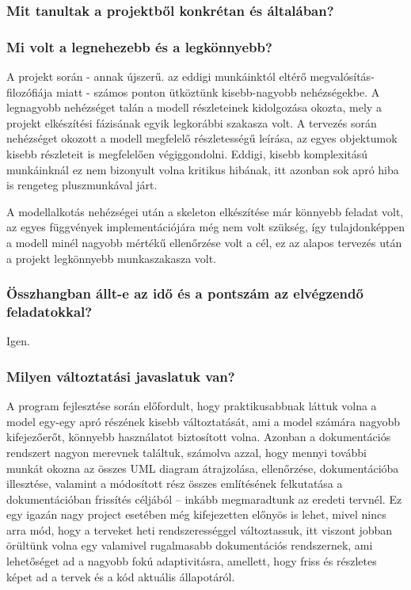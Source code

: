		\subsubsection*{Mit tanultak a projektből konkrétan és általában?}
		
		\subsubsection*{Mi volt a legnehezebb és a legkönnyebb?}
A projekt során - annak újszerű. az eddigi munkáinktól eltérő megvalósítás-filozófiája miatt - számos ponton ütköztünk kisebb-nagyobb nehézségekbe. A legnagyobb nehézséget talán a modell részleteinek kidolgozása okozta, mely a projekt elkészítési fázisának egyik legkorábbi szakasza volt. A tervezés során nehézséget okozott a modell megfelelő részletességű leírása, az egyes objektumok kisebb részleteit is megfelelően végiggondolni. Eddigi, kisebb komplexitású munkáinknál ez nem bizonyult volna kritikus hibának, itt azonban sok apró hiba is rengeteg pluszmunkával járt.

A modellalkotás nehézségei után a skeleton elkészítése már könnyebb feladat volt, az egyes függvények implementációjára még nem volt szükség, így tulajdonképpen a modell minél nagyobb mértékű ellenőrzése volt a cél, ez az alapos tervezés után a projekt legkönnyebb munkaszakasza volt.
		
		\subsubsection*{Összhangban állt-e az idő és a pontszám az elvégzendő feladatokkal?}
Igen.
		
		\subsubsection*{Milyen változtatási javaslatuk van?}
		A program fejlesztése során előfordult, hogy praktikusabbnak láttuk volna a model egy-egy apró részének kisebb változtatását, ami a model számára nagyobb kifejezőerőt, könnyebb használatot biztosított volna. Azonban a dokumentációs rendszert nagyon merevnek találtuk, számolva azzal, hogy mennyi további munkát okozna az összes UML diagram átrajzolása, ellenőrzése, dokumentációba illesztése, valamint a módosított rész összes említésének felkutatása a dokumentációban frissítés céljából -- inkább megmaradtunk az eredeti tervnél. Ez egy igazán nagy project esetében még kifejezetten előnyös is lehet, mivel nincs arra mód, hogy a terveket heti rendszerességgel változtassuk, itt viszont jobban örültünk volna egy valamivel rugalmasabb dokumentációs rendszernek, ami lehetőséget ad a nagyobb fokú adaptivitásra, amellett, hogy friss és részletes képet ad a tervek és a kód aktuális állapotáról.
		
